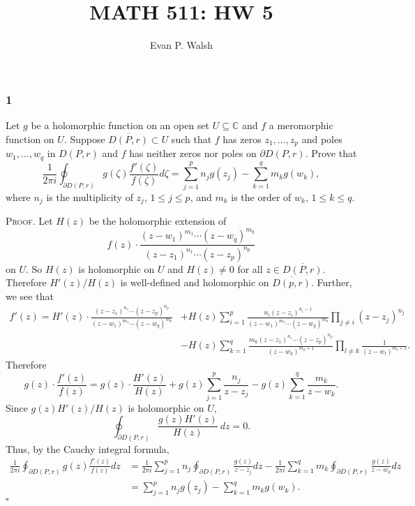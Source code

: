 \documentclass[12pt]{article}
\title{MATH 511: HW 5}
\author{Evan P. Walsh}
\newcounter{ProofCounter}
\newenvironment{Proof}{\stepcounter{ProofCounter}\textsc{Proof.}}{\hfill$\square$}
\begin{document}

\subsubsection*{1}
\begin{tcolorbox}
  Let $g$ be a holomorphic function on an open set $U \subseteq \mathbb{C}$ and $f$ a meromorphic function on $U$. Suppose $\overline{D(P,r)}
  \subset U$ such that $f$ has zeros $z_{1}, \hdots, z_{p}$ and poles $w_{1}, \hdots, w_{q}$ in $D(P,r)$ and $f$ has neither zeros nor poles on
  $\partial D(P,r)$. Prove that
  \[
    \frac{1}{2\pi i}\oint_{\partial D(P,r)}g(\zeta)\frac{f'(\zeta)}{f(\zeta)}d\zeta = \sum_{j=1}^{p}n_{j}g(z_{j}) - \sum_{k=1}^{q}m_{k}g(w_{k}),
  \]
  where $n_{j}$ is the multiplicity of $z_j$, $1 \leq j \leq p$, and $m_k$ is the order of $w_k$, $1 \leq k \leq q$.
\end{tcolorbox}
\begin{Proof}
  Let $H(z)$ be the holomorphic extension of
  \[ f(z)\cdot \frac{(z - w_1)^{m_1}\cdots (z - w_q)^{m_{q}}}{(z-z_1)^{n_{1}}\cdots (z - z_p)^{n_{p}}} \]
  on $U$. So $H(z)$ is holomorphic on $U$ and $H(z) \neq 0$ for all $z \in \overline{D(P,r)}$. Therefore $H'(z) / H(z)$ is well-defined and
  holomorphic on $\overline{D(p,r)}$. Further, we see that
  \begin{align*}
    f'(z) = H'(z)\cdot \frac{(z - z_1)^{n_1}\cdots (z - z_p)^{n_p}}{(z - w_1)^{m_1}\cdots (z - w_q)^{m_q}} & +
    H(z)\sum_{i=1}^{p}\frac{n_i(z - z_i)^{n_i-1}}{(z - w_1)^{m_1}\cdots(z-w_q)^{m_q}}\prod_{j\neq i}(z - z_j)^{n_j} \\
    & - H(z)\sum_{k=1}^{q}\frac{m_k(z-z_1)^{n_1}\cdots(z-z_p)^{n_p}}{(z - w_k)^{m_k + 1}}\prod_{l\neq k}\frac{1}{(z-w_l)^{m_l + 1}}.
  \end{align*}
  Therefore
  \[ g(z)\cdot\frac{f'(z)}{f(z)} = g(z)\cdot\frac{H'(z)}{H(z)} + g(z)\sum_{j=1}^{p}\frac{n_j}{z - z_j} - g(z)\sum_{k=1}^{q}\frac{m_k}{z - w_k}. \]
  Since $g(z) H'(z) / H(z)$ is holomorphic on $U$,
  \[
    \oint_{\partial D(P,r)}\frac{g(z)H'(z)}{H(z)}\ dz = 0.
  \]
  Thus, by the Cauchy integral formula,
  \begin{align*}
    \frac{1}{2\pi i}\oint_{\partial D(P,r)}g(z)\frac{f'(z)}{f(z)} dz & = \frac{1}{2\pi i}\sum_{j=1}^{p}n_j \oint_{\partial D(P,r)}\frac{g(z)}{z - z_j}dz -
    \frac{1}{2\pi i}\sum_{k=1}^{q}m_k \oint_{\partial D(P,r)}\frac{g(z)}{z - w_k}dz \\
    & = \sum_{j=1}^{p}n_{j}g(z_{j}) - \sum_{k=1}^{q}m_{k}g(w_{k}).
  \end{align*}
\end{Proof}
\end{document}
